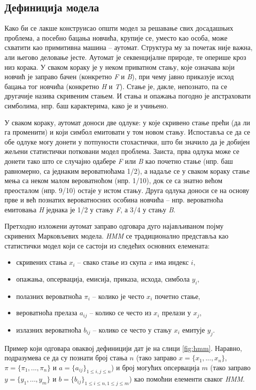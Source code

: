 \documentclass[12pt,oneside]{memoir}
\begin{document}
\begin{CJK}{UTF8}{ipxm}
\section{Дефиниција модела}
Како би се лакше конструисао општи модел за решавање свих досадашњих проблема, а посебно бацања новчића, крупије се, уместо као особа, може схватити као примитивна машина -- аутомат. Структура му за почетак није важна, али његово деловање јесте. Аутомат је секвенцијалне природе, те оперише кроз низ корака. У сваком кораку је у неком приватном стању, које означава који новчић је заправо бачен (конкретно \textit{F} и \textit{B}), при чему јавно приказује исход бацања тог новчића (конкретно \textit{H} и \textit{T}). Стање је, дакле, непознато, па се другачије назива скривеним стањем. И стања и опажања погодно је апстраховати симболима, нпр. баш карактерима, како је и учињено.

У сваком кораку, аутомат доноси две одлуке: у које скривено стање прећи (да ли га променити) и који симбол емитовати у том новом стању. Испоставља се да се обе одлуке могу донети у потпуности стохастички, што би значило да је добијен жељени статистички потковани модел проблема. Заиста, прва одлука може се донети тако што се случајно одабере \textit{F} или \textit{B} као почетно стање (нпр. баш равномерно, са једнаким вероватноћама 1/2), а надаље се у сваком кораку стање мења са неком малом вероватноћом (нпр. 1/10), док се са знатно већом преосталом (нпр. 9/10) остаје у истом стању. Друга одлука доноси се на основу прве и већ познатих вероватносних особина новчића -- нпр. вероватноћа емитовања \textit{H} једнака је 1/2 у стању \textit{F}, а 3/4 у стању \textit{B}.

Претходно изложени аутомат заправо одговара дуго најављиваном појму скривених Марковљевих модела. \textit{HMM} се традиционално представља као статистички модел који се састоји из следећих основних елемената:
\begin{itemize}
  \item скривених стања $x_i$ -- свако стање из скупа $x$ има индекс $i$,
  \item опажања, опсервација, емисија, приказа, исхода, симбола $y_i$,
  \item полазних вероватноћа $\pi_i$ -- колико је често $x_i$ почетно стање,
  \item вероватноћа прелаза $a_{ij}$ -- колико се често из $x_i$ прелази у $x_j$,
  \item излазних вероватноћа $b_{ij}$ -- колико се често у стању $x_i$ емитује $y_j$.
\end{itemize}
Пример који одговара оваквој дефиницији дат је на слици \ref{fig:hmm}. Наравно, подразумева се да су познати број стања $n$ (тако заправо $x = \{x_1, ..., x_n\}$, $\pi = \{\pi_1, ..., \pi_n\}$ и $a = \{a_{ij}\}_{1 \leq i, j \leq n}$) и број могућих опсервација $m$ (тако заправо $y = \{y_1, ..., y_m\}$ и $b = \{b_{ij}\}_{1 \leq i \leq n, 1 \leq j \leq m}$) као помоћни елементи сваког \textit{HMM}.


\end{CJK}
\end{document}

